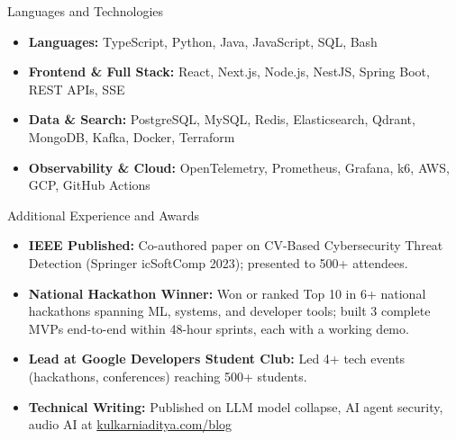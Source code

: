 \documentclass[]{mcdowellcv}
\begin{document}
\begin{cvsection}{Languages and Technologies}
  \begin{cvsubsection}{}{}{}
    \begin{itemize}
      \item \textbf{Languages:} TypeScript, Python, Java, JavaScript, SQL, Bash
      \item \textbf{Frontend \& Full Stack:} React, Next.js, Node.js, NestJS, Spring Boot, REST APIs, SSE
      \item \textbf{Data \& Search:} PostgreSQL, MySQL, Redis, Elasticsearch, Qdrant, MongoDB, Kafka, Docker, Terraform
      \item \textbf{Observability \& Cloud:} OpenTelemetry, Prometheus, Grafana, k6, AWS, GCP, GitHub Actions
    \end{itemize}
  \end{cvsubsection}
\end{cvsection}

\begin{cvsection}{Additional Experience and Awards}
  \begin{cvsubsection}{}{}{}
    \begin{itemize}
      \item \textbf{IEEE Published:} Co-authored paper on CV-Based Cybersecurity Threat Detection (Springer icSoftComp 2023); presented to 500+ attendees.
      \item \textbf{National Hackathon Winner:} Won or ranked Top 10 in 6+ national hackathons spanning ML, systems, and developer tools; built 3 complete MVPs end-to-end within 48-hour sprints, each with a working demo.
      \item \textbf{Lead at Google Developers Student Club:} Led 4+ tech events (hackathons, conferences) reaching 500+ students.
      \item \textbf{Technical Writing:} Published on LLM model collapse, AI agent security, audio AI at \href{https://www.kulkarniaditya.com/blog}{kulkarniaditya.com/blog}
    \end{itemize}
  \end{cvsubsection}
\end{cvsection}
\end{document}
